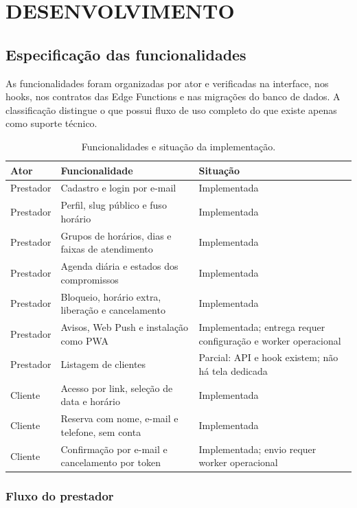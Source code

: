 \section{DESENVOLVIMENTO}

\subsection{Especificação das funcionalidades}

As funcionalidades foram organizadas por ator e verificadas na interface, nos hooks, nos contratos das Edge Functions e nas migrações do banco de dados. A classificação distingue o que possui fluxo de uso completo do que existe apenas como suporte técnico.

\begin{table}[htbp]
\centering
\caption{Funcionalidades e situação da implementação.}
\label{tab:funcionalidades}
\scriptsize
\begin{tabularx}{\textwidth}{>{\RaggedRight\arraybackslash}p{1.7cm}Y>{\RaggedRight\arraybackslash}p{4.0cm}}
\toprule
\textbf{Ator} & \textbf{Funcionalidade} & \textbf{Situação} \\
\midrule
Prestador & Cadastro e login por e-mail & Implementada \\
Prestador & Perfil, slug público e fuso horário & Implementada \\
Prestador & Grupos de horários, dias e faixas de atendimento & Implementada \\
Prestador & Agenda diária e estados dos compromissos & Implementada \\
Prestador & Bloqueio, horário extra, liberação e cancelamento & Implementada \\
Prestador & Avisos, Web Push e instalação como PWA & Implementada; entrega requer configuração e worker operacional \\
Prestador & Listagem de clientes & Parcial: API e hook existem; não há tela dedicada \\
Cliente & Acesso por link, seleção de data e horário & Implementada \\
Cliente & Reserva com nome, e-mail e telefone, sem conta & Implementada \\
Cliente & Confirmação por e-mail e cancelamento por token & Implementada; envio requer worker operacional \\
\bottomrule
\end{tabularx}
\fontepropria
\end{table}

\subsubsection{Fluxo do prestador}

